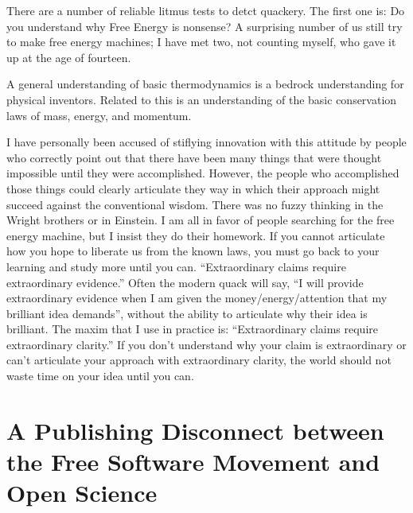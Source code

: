 \documentclass[
	fontsize=10pt, %
	twoside=false, %
	secnumdepth=1, %
]{kaobook}
\begin{document}
There are a number of reliable litmus tests to detct quackery.
The first one is: Do you understand why Free Energy is nonsense?
A surprising number of us still try to make free energy machines;
I have met two, not counting myself, who gave it up at the age of fourteen.

A general understanding of basic thermodynamics is a bedrock
understanding for physical inventors.
Related to this is an understanding of the basic conservation laws
of mass, energy, and momentum.

I have personally been accused of stiflying innovation with
this attitude by people who correctly point out that there have
been many things that were thought impossible until they were accomplished.
However, the people who accomplished those things could clearly
articulate they way in which their approach might succeed against
the conventional wisdom. There was no fuzzy thinking in the
Wright brothers or in Einstein. I am all in favor of
people searching for the free energy machine, but I insist
they do their homework.
If you cannot articulate how you hope to liberate us from the
known laws, you must go back to your learning and study more
until you can. ``Extraordinary claims require extraordinary
evidence.'' Often the modern quack will say, ``I will
provide extraordinary evidence when I am given the
money/energy/attention that my brilliant idea demands'',
without the ability to articulate why their idea is brilliant.
The maxim that I use in practice is: ``Extraordinary claims require
extraordinary clarity.''
If you don't understand why your claim is extraordinary or
can't articulate your approach with extraordinary clarity,
the world should not waste time on your idea until you can.

\chapter{A Publishing Disconnect between the Free Software Movement and Open Science}
\label{chap:publishdisconnect}
\end{document}

